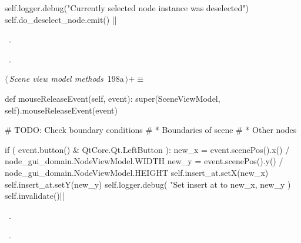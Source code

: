 \documentclass[%
    a4paper,    %
    justified,  %
    nobib,      %
    openany     %
]{tufte-book}
\makeatletter
\renewcommand{\label}[1]{\@tufte@label{##1}}%
\makeatother
\begin{document}
\begin{fullwidth}
\begin{flushleft}
\begin{minipage}{\linewidth}
\begin{pythoncode}
    self.logger.debug("Currently selected node instance was deselected")
    self.do_deselect_node.emit()
|\NWsep|
\end{pythoncode}
\vspace{1.5ex}
\footnotesize
\begin{list}{}{\setlength{\itemsep}{-\parsep}\setlength{\itemindent}{-\leftmargin}}
\item \NWtxtMacroDefBy\ .
\item \NWtxtMacroRefIn\ .

\item{}
\end{list}
\end{minipage}\vspace{4ex}
\end{flushleft}
\begin{flushleft} \small
\begin{minipage}{\linewidth}\label{scrap189}\raggedright\small
{} $\langle\,${\itshape Scene view model methods}\nobreak\ {\footnotesize {198a}}$\,\rangle+\equiv$
\vspace{-1ex}
\begin{pythoncode}
def mouseReleaseEvent(self, event):
    super(SceneViewModel, self).mouseReleaseEvent(event)

    # TODO: Check boundary conditions
    # * Boundaries of scene
    # * Other nodes

    if (
            event.button() & QtCore.Qt.LeftButton
    ):
        new_x = event.scenePos().x() / node_gui_domain.NodeViewModel.WIDTH
        new_y = event.scenePos().y() / node_gui_domain.NodeViewModel.HEIGHT
        self.insert_at.setX(new_x)
        self.insert_at.setY(new_y)
        self.logger.debug(
            "Set insert at to %
            new_x, new_y
        )
        self.invalidate()|\NWsep|
\end{pythoncode}
\vspace{1.5ex}
\footnotesize
\begin{list}{}{\setlength{\itemsep}{-\parsep}\setlength{\itemindent}{-\leftmargin}}
\item \NWtxtMacroDefBy\ .
\item \NWtxtMacroRefIn\ .


\end{list}
\end{minipage}
\end{flushleft}
\end{fullwidth}
\end{document}
